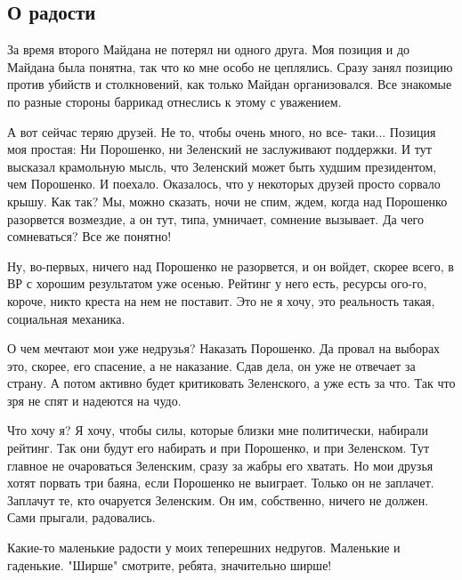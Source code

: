  
 
 
 
 
\subsection{О радости}

За время второго Майдана не потерял ни одного друга. Моя позиция и до Майдана
была понятна, так что ко мне особо не цеплялись. Сразу занял позицию против
убийств и столкновений, как только Майдан организовался. Все знакомые по разные
стороны баррикад отнеслись к этому с уважением. 

А вот сейчас теряю друзей. Не то, чтобы очень много, но все- таки... Позиция
моя простая: Ни Порошенко, ни Зеленский не заслуживают поддержки. И тут
высказал крамольную мысль, что Зеленский может быть худшим президентом, чем
Порошенко. И поехало. Оказалось, что у некоторых друзей просто сорвало крышу.
Как так? Мы, можно сказать, ночи не спим, ждем, когда над Порошенко разорвется
возмездие, а он тут, типа, умничает, сомнение вызывает. Да чего сомневаться?
Все же понятно!

Ну, во-первых, ничего над Порошенко не разорвется, и он войдет, скорее всего, в
ВР с хорошим результатом уже осенью.  Рейтинг у него есть, ресурсы ого-го,
короче, никто креста на нем не поставит. Это не я хочу, это реальность такая,
социальная механика. 

О чем мечтают мои уже недрузья? Наказать Порошенко. Да провал на выборах это,
скорее, его спасение, а не наказание. Сдав дела, он уже не отвечает за страну.
А потом активно будет критиковать Зеленского, а уже есть за что. Так что зря не
спят и надеются на чудо. 

Что хочу я? Я хочу, чтобы силы, которые близки мне политически, набирали
рейтинг. Так они будут его набирать и при Порошенко, и при Зеленском. Тут
главное не очароваться Зеленским, сразу за жабры его хватать. Но мои друзья
хотят порвать три баяна, если Порошенко не выиграет. Только он не заплачет.
Заплачут те, кто очаруется Зеленским. Он им, собственно, ничего не должен. Сами
прыгали, радовались.  

Какие-то маленькие радости у моих теперешних недругов.
Маленькие и гаденькие. "Ширше" смотрите, ребята, значительно ширше!

